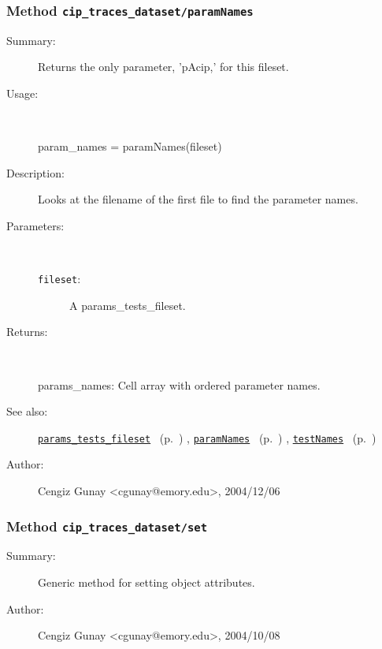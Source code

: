 \subsubsection[Method \texttt{paramNames}]{Method \texttt{cip\_traces\_dataset/paramNames}}%
%
\label{ref_cip_traces_dataset__paramNames}%
\hypertarget{ref_cip_traces_dataset__paramNames}{}%
\begin{description}
\item[Summary:]Returns the only parameter, 'pAcip,' for this fileset.
%
\item[Usage:]~%
\begin{lyxcode}%
param\_names = paramNames(fileset)
%
\end{lyxcode}%
%
\item[Description:]%
Looks at the filename of the first file to find the parameter names.
\item[Parameters:]~
\begin{description}%
\item[\texttt{fileset}:]
 A params\_tests\_fileset.
\end{description}%
%
\item[Returns:
]~

	params\_names: Cell array with ordered parameter names.
%
%
\item[See also:]%
\hyperlink{ref_params_tests_fileset}{\texttt{params\_tests\_fileset}}%
\ (p.~\pageref{ref_params_tests_fileset})%
%
, \hyperlink{ref_paramNames}{\texttt{paramNames}}%
\ (p.~\pageref{ref_paramNames})%
%
, \hyperlink{ref_testNames}{\texttt{testNames}}%
\ (p.~\pageref{ref_testNames})%
%
%
\item[Author:]%
Cengiz Gunay <cgunay@emory.edu>, 2004/12/06
%
\end{description}
\methodline%
\subsubsection[Method \texttt{set}]{Method \texttt{cip\_traces\_dataset/set}}%
%
\label{ref_cip_traces_dataset__set}%
\hypertarget{ref_cip_traces_dataset__set}{}%
\begin{description}
\item[Summary:]Generic method for setting object attributes.
%
%
%
%
%
%
%
\item[Author:]%
Cengiz Gunay <cgunay@emory.edu>, 2004/10/08
%
\end{description}
\methodline%

